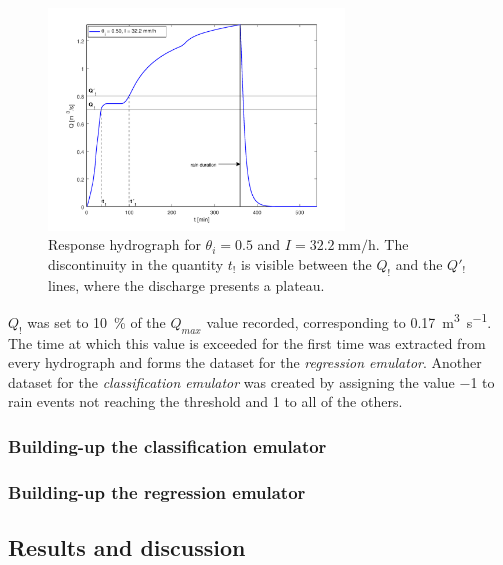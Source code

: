 \begin{figure}[h]
  \centering
  \includegraphics[width=0.7\textwidth]{Figures/hydrograph.png}
  \caption{Response hydrograph for $\theta_i = \num{0.5}$ and $I = \SI{32.2}{\milli\meter\per\hour}$. The discontinuity in the quantity $t_!$ is visible between the $Q_!$ and the $Q'_!$ lines, where the discharge presents a plateau.}
  \label{fig:hydrograph}
\end{figure}

$Q_!$ was set to \SI{10}{\percent}  of the $Q_{max}$ value recorded, corresponding to \SI{0.17}{\cubic\meter\per\second}.
The time at which this value is exceeded for the first time was extracted from every hydrograph and forms the dataset for the \emph{regression emulator}.
Another dataset for the \emph{classification emulator} was created by assigning the value \num{-1} to rain events not reaching the threshold and \num{1} to all of the others.


\subsubsection{Building-up the classification emulator}


\subsubsection{Building-up the regression emulator}


\subsection{Results and discussion}

